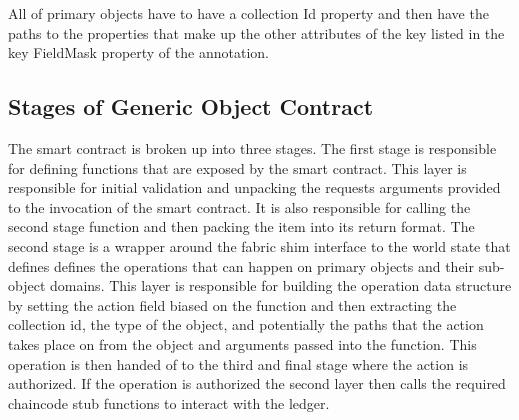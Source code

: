 All of primary objects have to have a collection Id property and then have the paths to the properties that make up the other attributes of the key listed in the key FieldMask property of the annotation.


\subsection[short]{Stages of Generic Object Contract}
The smart contract is broken up into three stages. The first stage is responsible for defining functions that are exposed by the smart contract. This layer is responsible for initial validation and unpacking the requests arguments provided to the invocation of the smart contract. It is also responsible for calling the second stage function and then packing the item into its return format. The second stage is a wrapper around the fabric shim interface to the world state that defines defines the operations that can happen on primary objects and their sub-object domains. This layer is responsible for building the operation data structure by setting the action field biased on the function and then extracting the collection id, the type of the object, and potentially the paths that the action takes place on from the object and arguments passed into the function. This operation is then handed of to the third and final stage where the action is authorized. If the operation is authorized the second layer then calls the required chaincode stub functions to interact with the ledger.



